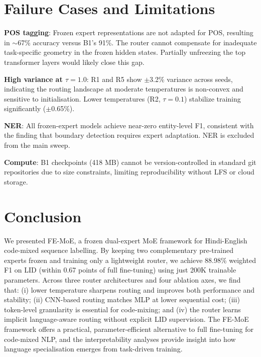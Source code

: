 \documentclass[conference]{IEEEtran}
\begin{document}
\section{Failure Cases and Limitations}

\textbf{POS tagging}: Frozen expert representations are not adapted for POS, resulting in $\sim$67\% accuracy versus B1's 91\%. The router cannot compensate for inadequate task-specific geometry in the frozen hidden states. Partially unfreezing the top transformer layers would likely close this gap.

\textbf{High variance at $\tau{=}1.0$}: R1 and R5 show $\pm$3.2\% variance across seeds, indicating the routing landscape at moderate temperatures is non-convex and sensitive to initialisation. Lower temperatures (R2, $\tau{=}0.1$) stabilize training significantly ($\pm$0.65\%).

\textbf{NER}: All frozen-expert models achieve near-zero entity-level F1, consistent with the finding that boundary detection requires expert adaptation. NER is excluded from the main sweep.

\textbf{Compute}: B1 checkpoints (418 MB) cannot be version-controlled in standard git repositories due to size constraints, limiting reproducibility without LFS or cloud storage.

\section{Conclusion}

We presented FE-MoE, a frozen dual-expert MoE framework for Hindi-English code-mixed sequence labelling. By keeping two complementary pre-trained experts frozen and training only a lightweight router, we achieve 88.98\% weighted F1 on LID (within 0.67 points of full fine-tuning) using just 200K trainable parameters. Across three router architectures and four ablation axes, we find that: (i) lower temperature sharpens routing and improves both performance and stability; (ii) CNN-based routing matches MLP at lower sequential cost; (iii) token-level granularity is essential for code-mixing; and (iv) the router learns implicit language-aware routing without explicit LID supervision. The FE-MoE framework offers a practical, parameter-efficient alternative to full fine-tuning for code-mixed NLP, and the interpretability analyses provide insight into how language specialisation emerges from task-driven training.



\end{document}
